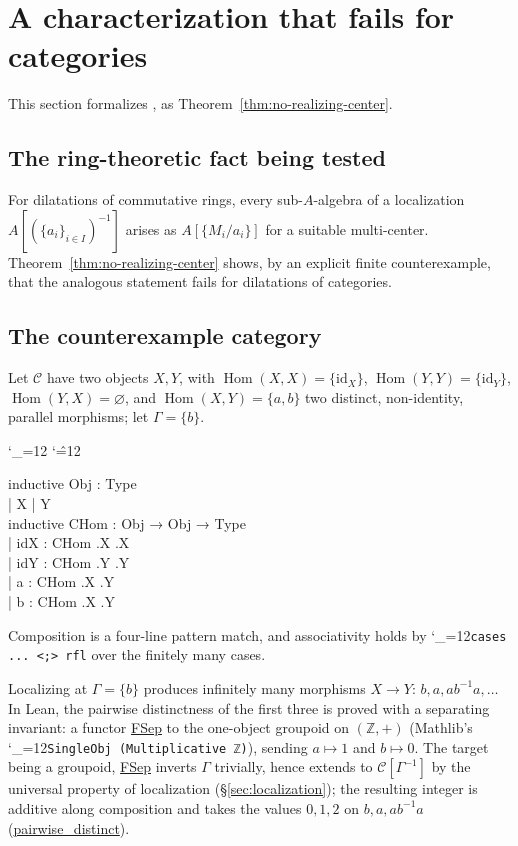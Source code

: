 \documentclass[11pt]{amsart}
\newcommand{\lc}[1]{\url{#1}}
\newcommand{\lcode}{\begingroup\catcode`\_=12\relax\lcodeInner}
\newcommand{\lcodeInner}[1]{\texttt{#1}\endgroup}
\newenvironment{leancode}{%
  \begingroup
  \catcode`\_=12\relax
  \catcode`\^=12\relax
  \small\ttfamily\raggedright\baselineskip=1.15\baselineskip
  \par\smallskip\noindent
}{%
  \par\smallskip
  \endgroup
}
\theoremstyle{plain}
\theoremstyle{definition}
\theoremstyle{remark}
\newcommand{\calC}{\mathcal C}
\newcommand{\id}{\mathrm{id}}
\DeclareMathOperator{\Hom}{Hom}
\begin{document}
\section{A characterization that fails for categories}
\label{sec:counterexample}

This section formalizes \citep[Fact~5.2]{Mayeux}, as Theorem~\ref{thm:no-realizing-center}.

\subsection{The ring-theoretic fact being tested}

For dilatations of commutative rings, every sub-$A$-algebra of a localization
$A[(\{a_i\}_{i\in I})^{-1}]$ arises as $A[\{M_i/a_i\}]$ for a suitable multi-center.
Theorem~\ref{thm:no-realizing-center} shows, by an explicit finite counterexample, that the
analogous statement fails for dilatations of categories.

\subsection{The counterexample category}

Let $\calC$ have two objects $X,Y$, with $\Hom(X,X) = \{\id_X\}$, $\Hom(Y,Y)=\{\id_Y\}$,
$\Hom(Y,X) = \varnothing$, and $\Hom(X,Y) = \{a,b\}$ two distinct, non-identity, parallel
morphisms; let $\Gamma = \{b\}$.

\begin{leancode}
inductive Obj : Type \\
  | X | Y \\[0.5\baselineskip]
inductive CHom : Obj → Obj → Type \\
  | idX : CHom .X .X \\
  | idY : CHom .Y .Y \\
  | a : CHom .X .Y \\
  | b : CHom .X .Y \\
\end{leancode}
Composition is a four-line pattern match, and associativity holds by \lcode{cases ...
<;> rfl} over the finitely many cases.

Localizing at $\Gamma=\{b\}$ produces infinitely many morphisms $X \to Y$: $b, a,
ab^{-1}a, \dots$ In Lean, the pairwise distinctness of the first three is proved with a
separating invariant: a functor \lc{FSep} to the one-object groupoid on $(\mathbb Z,+)$
(Mathlib's \lcode{SingleObj (Multiplicative ℤ)}), sending $a \mapsto 1$ and $b\mapsto 0$.
The target being a groupoid, \lc{FSep} inverts $\Gamma$ trivially, hence extends to
$\calC[\Gamma^{-1}]$ by the universal property of localization (\S\ref{sec:localization});
the resulting integer is additive along composition and takes the values $0,1,2$ on
$b, a, ab^{-1}a$ (\lc{pairwise_distinct}).
\end{document}

